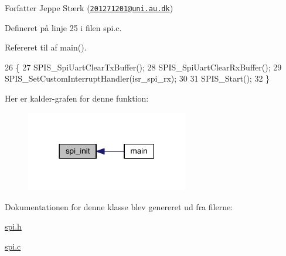 \begin{DoxyAuthor}{Forfatter}
Jeppe Stærk (\href{mailto:201271201@uni.au.dk}{\tt 201271201@uni.\+au.\+dk}) 
\end{DoxyAuthor}


Defineret på linje 25 i filen spi.\+c.



Refereret til af main().


\begin{DoxyCode}
26 \{
27   SPIS\_SpiUartClearTxBuffer();
28   SPIS\_SpiUartClearRxBuffer();
29   SPIS\_SetCustomInterruptHandler(isr\_spi\_rx);
30   
31   SPIS\_Start();
32 \}
\end{DoxyCode}


Her er kalder-\/grafen for denne funktion\+:
\nopagebreak
\begin{figure}[H]
\begin{center}
\leavevmode
\includegraphics[width=201pt]{d3/dfe/class_s_p_i_a5db0aceecaf7db5fbe2984e88fef3734_icgraph}
\end{center}
\end{figure}




Dokumentationen for denne klasse blev genereret ud fra filerne\+:\begin{DoxyCompactItemize}
\item 
\hyperlink{spi_8h}{spi.\+h}\item 
\hyperlink{spi_8c}{spi.\+c}\end{DoxyCompactItemize}
